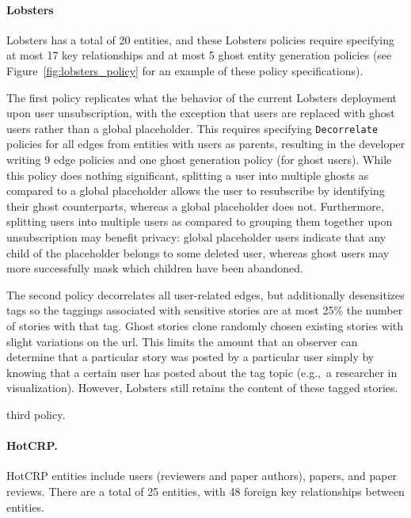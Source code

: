 \paragraph{Lobsters}
Lobsters has a total of 20 entities, and 
these Lobsters policies require specifying at most 17 key
relationships and at most 5 ghost entity generation policies (see Figure~\ref{fig:lobsters_policy} for an example
of these policy specifications).

The first policy replicates what the behavior of the current Lobsters deployment upon user
unsubscription, with the exception that users are replaced with ghost users rather than a global
placeholder. This requires specifying \texttt{Decorrelate} policies for all edges from entities with users
as parents, resulting in the developer writing 9 edge policies and one ghost generation policy (for
ghost users). While this policy does nothing significant, splitting a user into multiple ghosts as
compared to a global placeholder allows the user to resubscribe by identifying their ghost
counterparts, whereas a global placeholder does not. Furthermore, splitting users into multiple
users as compared to grouping them together upon unsubscription may benefit privacy: global
placeholder users indicate that any child of the placeholder belongs to some deleted user, whereas
ghost users may more successfully mask which children have been abandoned.

The second policy decorrelates all user-related edges, but additionally desensitizes tags so the
taggings associated with sensitive stories are at most 25\% the number of stories with that tag.
Ghost stories clone randomly chosen existing stories with slight variations on the url.
This limits the amount that an observer can determine that a particular story was posted by a
particular user simply by knowing that a certain user has posted about the tag topic (e.g.,\ a researcher 
in visualization). However, Lobsters still retains the content of these tagged stories.

 third policy.

\paragraph{HotCRP.}
HotCRP entities include users (reviewers and paper authors), papers, and paper reviews. There are a total of 25
entities, with 48 foreign key relationships between entities.

